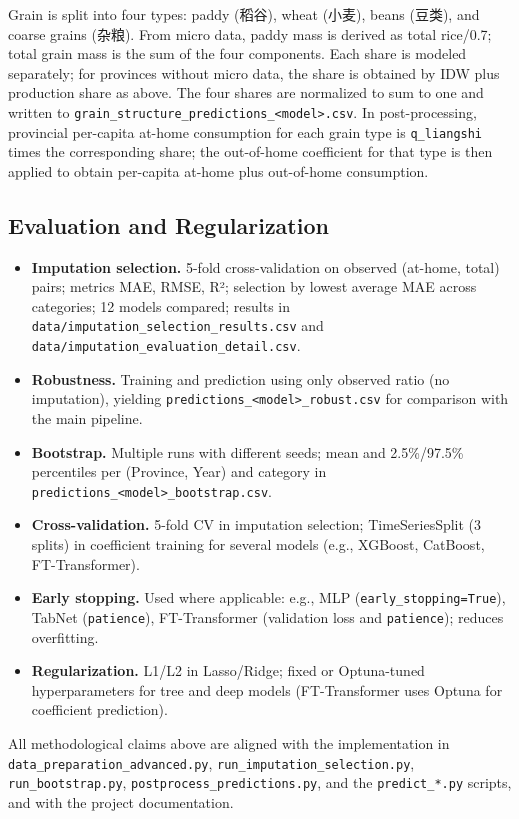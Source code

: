 Grain is split into four types: paddy (稻谷), wheat (小麦), beans (豆类), and coarse grains (杂粮). From micro data, paddy mass is derived as total rice/0.7; total grain mass is the sum of the four components. Each share is modeled separately; for provinces without micro data, the share is obtained by IDW plus production share as above. The four shares are normalized to sum to one and written to \texttt{grain\_structure\_predictions\_<model>.csv}. In post-processing, provincial per-capita at-home consumption for each grain type is \texttt{q\_liangshi} times the corresponding share; the out-of-home coefficient for that type is then applied to obtain per-capita at-home plus out-of-home consumption.

\subsection{Evaluation and Regularization}

\begin{itemize}
  \item \textbf{Imputation selection.} 5-fold cross-validation on observed (at-home, total) pairs; metrics MAE, RMSE, R²; selection by lowest average MAE across categories; 12 models compared; results in \texttt{data/imputation\_selection\_results.csv} and \texttt{data/imputation\_evaluation\_detail.csv}.
  \item \textbf{Robustness.} Training and prediction using only observed ratio (no imputation), yielding \texttt{predictions\_<model>\_robust.csv} for comparison with the main pipeline.
  \item \textbf{Bootstrap.} Multiple runs with different seeds; mean and 2.5\%/97.5\% percentiles per (Province, Year) and category in \texttt{predictions\_<model>\_bootstrap.csv}.
  \item \textbf{Cross-validation.} 5-fold CV in imputation selection; TimeSeriesSplit (3 splits) in coefficient training for several models (e.g., XGBoost, CatBoost, FT-Transformer).
  \item \textbf{Early stopping.} Used where applicable: e.g., MLP (\texttt{early\_stopping=True}), TabNet (\texttt{patience}), FT-Transformer (validation loss and \texttt{patience}); reduces overfitting.
  \item \textbf{Regularization.} L1/L2 in Lasso/Ridge; fixed or Optuna-tuned hyperparameters for tree and deep models (FT-Transformer uses Optuna for coefficient prediction).
\end{itemize}

All methodological claims above are aligned with the implementation in \texttt{data\_preparation\_advanced.py}, \texttt{run\_imputation\_selection.py}, \texttt{run\_bootstrap.py}, \texttt{postprocess\_predictions.py}, and the \texttt{predict\_*.py} scripts, and with the project documentation.
